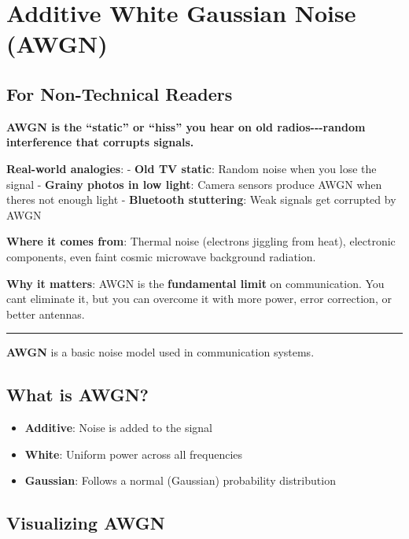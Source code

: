 \section{Additive White Gaussian Noise
(AWGN)}\label{additive-white-gaussian-noise-awgn}

\subsection{\texorpdfstring{ For Non-Technical
Readers}{ For Non-Technical Readers}}\label{for-non-technical-readers}

\textbf{AWGN is the ``static'' or ``hiss'' you hear on old
radios-\/-\/-random interference that corrupts signals.}

\textbf{Real-world analogies}: - \textbf{Old TV static}: Random noise
when you lose the signal - \textbf{Grainy photos in low light}: Camera
sensors produce AWGN when there\textquotesingle s not enough light -
\textbf{Bluetooth stuttering}: Weak signals get corrupted by AWGN

\textbf{Where it comes from}: Thermal noise (electrons jiggling from
heat), electronic components, even faint cosmic microwave background
radiation.

\textbf{Why it matters}: AWGN is the \textbf{fundamental limit} on
communication. You can\textquotesingle t eliminate it, but you can
overcome it with more power, error correction, or better antennas.

\begin{center}\rule{0.5\linewidth}{0.5pt}\end{center}

\textbf{AWGN} is a basic noise model used in communication systems.

\subsection{What is AWGN?}\label{what-is-awgn}

\begin{itemize}
\tightlist
\item
  \textbf{Additive}: Noise is added to the signal
\item
  \textbf{White}: Uniform power across all frequencies
\item
  \textbf{Gaussian}: Follows a normal (Gaussian) probability
  distribution
\end{itemize}

\subsection{Visualizing AWGN}\label{visualizing-awgn}

